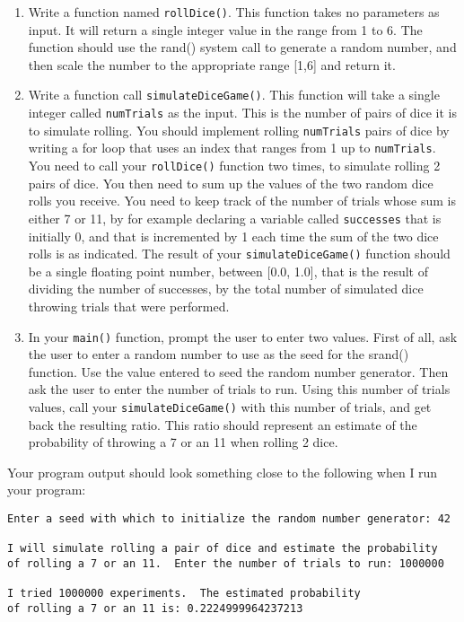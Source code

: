 \documentclass[11pt]{article}
\begin{document}
\begin{enumerate}
\item Write a function named \verb~rollDice()~.  This function takes no
parameters as input.  It will return a single integer value in the
range from 1 to 6.  The function should use the rand()
system call to generate a random number, and then scale the
number to the appropriate range [1,6] and return it.

\item Write a function call \verb~simulateDiceGame()~.  This function will
take a single integer called \verb~numTrials~ as the input.  This is the
number of pairs of dice it is to simulate rolling.  You should
implement rolling \verb~numTrials~ pairs of dice by writing a for loop
that uses an index that ranges from 1 up to \verb~numTrials~.  You need
to call your \verb~rollDice()~ function two times, to simulate rolling 2
pairs of dice.  You then need to sum up the values of the two
random dice rolls you receive.  You need to keep track of the
number of trials whose sum is either 7 or 11, by for example
declaring a variable called \verb~successes~ that is initially 0, and
that is incremented by 1 each time the sum of the two dice rolls is
as indicated.  The result of your \verb~simulateDiceGame()~ function should
be a single floating point number, between [0.0, 1.0], that is the
result of dividing the number of successes, by the total number of
simulated dice throwing trials that were performed.

\item In your \verb~main()~ function, prompt the user to enter two values.
First of all, ask the user to enter a random number to use as the
seed for the srand() function.  Use the value entered to seed the
random number generator.  Then ask the user to enter the number of
trials to run. Using this number of trials values, call your
\verb~simulateDiceGame()~ with this number of trials, and get back the
resulting ratio.  This ratio should represent an estimate of the
probability of throwing a 7 or an 11 when rolling 2 dice.
\end{enumerate}

Your program output should look something close to the following when I
run your program:

\begin{verbatim}
Enter a seed with which to initialize the random number generator: 42

I will simulate rolling a pair of dice and estimate the probability
of rolling a 7 or an 11.  Enter the number of trials to run: 1000000

I tried 1000000 experiments.  The estimated probability
of rolling a 7 or an 11 is: 0.2224999964237213
\end{verbatim}
\end{document}
